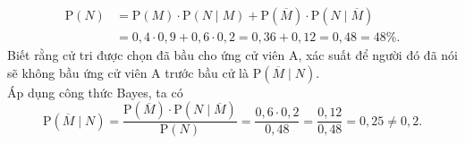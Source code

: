 \begin{ex}
{\begin{itemchoice}
			\begin{align*}
				\mathrm{P}(N) &= \mathrm{P}(M) \cdot \mathrm{P}(N \mid M) + \mathrm{P}\left( \overline{M}\right)  \cdot \mathrm{P}\left( N \mid \overline{M}\right)  \\
				&= 0{,}4 \cdot 0{,}9 + 0{,}6 \cdot 0{,}2 = 0{,}36 + 0{,}12 = 0{,}48 = 48\%.
			\end{align*}
			\itemch Biết rằng cử tri được chọn đã bầu cho ứng cử viên A, xác suất để người đó đã nói sẽ không bầu ứng cử viên A trước bầu cử là $\mathrm{P}\left( \overline{M} \mid N\right)$.\\
			Áp dụng công thức Bayes, ta có
			\[\mathrm{P}\left(\overline{M} \mid N\right)  = \dfrac{\mathrm{P}\left( \overline{M}\right) \cdot \mathrm{P}\left(N \mid \overline{M}\right) }{\mathrm{P}(N)} = \dfrac{0{,}6 \cdot 0{,}2}{0{,}48} = \dfrac{0{,}12}{0{,}48} = 0{,}25 \neq 0{,}2.\]
		\end{itemchoice}
	}
\end{ex}

